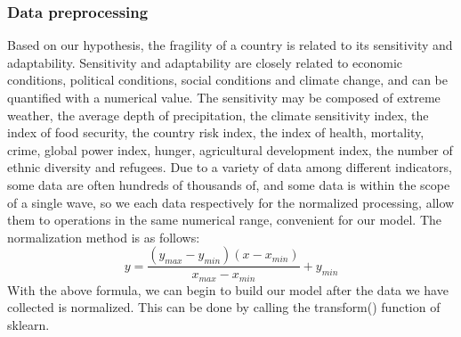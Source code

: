 \documentclass{mcmthesis}
\begin{document}
\subsubsection{Data preprocessing}
Based on our hypothesis, the fragility of a country is related to its 
sensitivity and adaptability. Sensitivity and adaptability are closely 
related to economic conditions, political conditions, social conditions and 
climate change, and can be quantified with a numerical value. The sensitivity 
may be composed of extreme weather, the average depth of precipitation, the 
climate sensitivity index, the index of food security, the country risk index, 
the index of health, mortality, crime, global power index, hunger, agricultural 
development index, the number of ethnic diversity and refugees. Due to a variety 
of data among different indicators, some data are often hundreds of thousands of, 
and some data is within the scope of a single wave, so we each data respectively 
for the normalized processing, allow them to operations in the same numerical range, 
convenient for our model. The normalization method is as follows:
\[ y=\frac{\left ( y_{max}-y_{min} \right )\left ( x-x_{min} \right )}{x_{max}-x_{min}}+y_{min} \]
With the above formula, we can begin to build our model after the data we have 
collected is normalized. This can be done by calling the transform() function 
of sklearn.
\end{document}
